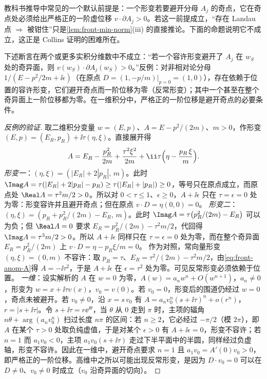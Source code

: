 教科书推导中常见的一个默认前提是：一个形变若要避开分母 $A_j$ 的奇点，它在奇点处必须给出严格正的一阶虚位移 $v\cdot\partial A_j>0$。若这一前提成立，“存在 Landau 点 $\Rightarrow$ 被钳住”只是\cref{lem:front-min-norm}(iii) 的直接推论。下面的命题说明它不成立，这正是 Collins 证明的困难所在。

\begin{proposition}\label{prop:front-anomalous}
下述断言在两个或更多实积分维数中不成立：“若一个容许形变避开了 $A_j$ 在 $w_S$ 处的奇异面，则 $v(w_S)\cdot\partial A_j(w_S)>0$。”反例：对非相对论分母 $1/(E-p^2/2m+\ii\epsilon)$（在原点 $D=(1,-p/m)|_{p=0}=(1,0)$），存在依赖于位置的容许形变，它们避开奇点而一阶位移为零（反常形变）；其中一个甚至在整个奇异面上一阶位移都为零。在一维积分中，严格正的一阶位移是避开奇点的必要条件。
\end{proposition}

\begin{proof}[反例的验证]
取二维积分变量 $w=(E,p)$、$A=E-p^2/(2m)$、$m>0$，作形变 $(E,p)=(E_R,p_R)+\ii\tau(\eta,\xi)$。直接展开得
\begin{equation}\label{eq:front-anom-A}
A=E_R-\frac{p_R^2}{2m}+\frac{\tau^2\xi^2}{2m}+\ii\tau\Bigl(\eta-\frac{p_R\,\xi}{m}\Bigr).
\end{equation}
\emph{形变一}\cite[附录~B.1]{Collins:2020euz}：$(\eta,\xi)=(|E_R|+2|p_R|,\,m)$。此时 $\Imag A=\tau(|E_R|+2|p_R|-p_R)\ge\tau(|E_R|+|p_R|)\ge0$，等号只在原点成立，而原点处 $\Real A=\tau^2m/2>0$。所以对 $0<\tau\le1$、$\epsilon\ge0$，$A+\ii\epsilon$ 只在 $\tau=\epsilon=0$ 处为零：形变容许并且避开奇点；但在原点 $v\cdot D=\eta(0,0)=0$。
\emph{形变二}：$(\eta,\xi)=(p_R+p_R^2/(2m)-E_R,\,m)$。此时 $\Imag A=\tau\bigl(p_R^2/(2m)-E_R\bigr)$ 可以为负；但 $\Real A=0$ 要求 $E_R=p_R^2/(2m)-\tau^2m/2$，代回得 $\Imag A=\tau^3m/2>0$。所以 $A+\ii\epsilon$ 同样只在 $\tau=\epsilon=0$ 处为零，而在整个奇异面 $E_R=p_R^2/(2m)$ 上 $v\cdot D=\eta-p_R\xi/m=0$。
作为对照，常向量形变 $(\eta,\xi)=(0,m)$ 不容许：取 $p_R=\tau$、$E_R=\tau^2/(2m)-\tau^2m/2$，由\cref{eq:front-anom-A}得 $A=-\ii\tau^2$，于是 $A+\ii\epsilon$ 在 $\epsilon=\tau^2$ 处为零。可见反常形变必须依赖于位置。
\emph{一维}\cite[附录~B.2]{Collins:2020euz}：设实解析的 $A$ 在 $w=0$ 为零，$A(w)=a_nw^n+O(w^{n+1})$，$a_n\ne0$，形变为 $w=x+\ii\tau v(x)$，$v_0=v(0)$。若 $v_0=0$，形变后的围道仍经过 $w=0$，奇点未被避开。若 $v_0\ne0$，沿 $x=s\,v_0$ 有 $A=a_n v_0^n(s+\ii\tau)^n+o(r^n)$，$r=|s+\ii\tau|$。令 $s+\ii\tau=r\ee^{\ii\theta}$，当 $\theta$ 从 $0$ 走到 $\pi$ 时，主项的辐角 $n\theta+\arg(a_nv_0^n)$ 扫过长度 $n\pi$ 的区间：若 $n\ge2$，它必经过 $-\pi/2$（模 $2\pi$），即 $A$ 在某个 $\tau>0$ 处取负纯虚值，于是对某个 $\epsilon>0$ 有 $A+\ii\epsilon=0$，形变不容许；若 $n=1$ 而 $a_1v_0<0$，主项 $a_1v_0(s+\ii\tau)$ 走过下半平面中的半圆，同样经过负虚轴，形变不容许。因此在一维中，避开奇点要求 $n=1$ 且 $a_1v_0=A'(0)v_0>0$，即严格正的一阶位移。高维中之所以可能出现反常形变，是因为 $D\cdot v_0=0$ 可以在 $D\ne0$、$v_0\ne0$ 时成立（$v_0$ 沿奇异面的切向）。
\end{proof}

